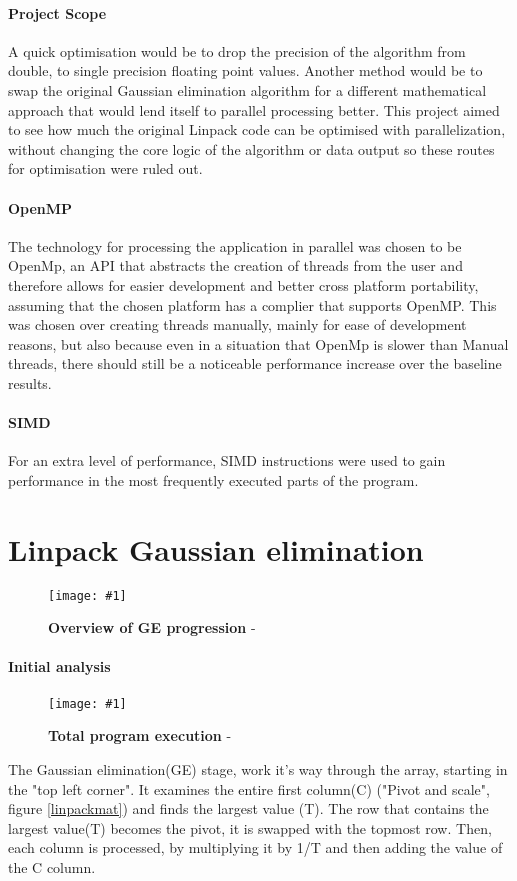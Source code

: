 \documentclass[conference]{acmsiggraph}
\newcommand{\figuremacroW}[4]{
	\begin{figure}[h] %
		\centering
		\texttt{[image: \#1]}
		\caption[#2]{\textbf{#2} - #3}
		\label{fig:#1}
	\end{figure}
}
\begin{document}
\paragraph{Project Scope}
A quick optimisation would be to drop the precision of the algorithm from double, to single precision floating point values.
Another method would be to swap the original Gaussian elimination algorithm for a different mathematical approach that would lend itself to parallel processing better.
This project aimed to see how much the original Linpack code can be optimised with parallelization, without changing the core logic of the algorithm or data output so these routes for optimisation were ruled out.

\paragraph{OpenMP}
The technology for processing the application in parallel was chosen to be OpenMp, an API that abstracts the creation of threads from the user and therefore allows for easier development and better cross platform portability, assuming that the chosen platform has a complier that supports OpenMP.
This was chosen over creating threads manually, mainly for ease of development reasons, but also because even in a situation that OpenMp is slower than Manual threads, there should still be a noticeable performance increase over the baseline results.

\paragraph{SIMD}
For an extra level of performance, SIMD instructions were used to gain performance in the most frequently executed parts of the program.

\section{Linpack Gaussian elimination}

\figuremacroW
{linpackmat}
{Overview of GE progression}
{}
{1.0}

\paragraph{Initial analysis}
\figuremacroW
{pie}
{Total program execution}
{}
{0.8}

The Gaussian elimination(GE) stage, work it's way through the array, starting in the "top left corner".
It examines the entire first column(C) ("Pivot and scale", figure \ref{linpackmat}) and finds the largest value (T).
The row that contains the largest value(T) becomes the pivot, it is swapped with the topmost row.
Then, each column is processed, by multiplying it by 1/T and then adding the value of the C column.
\end{document}
